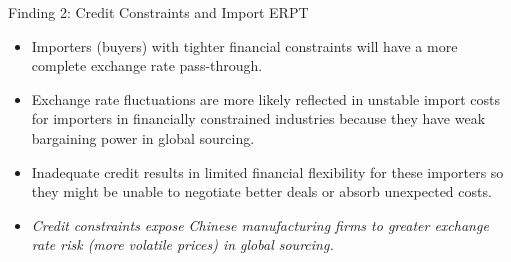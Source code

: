 \documentclass[10pt]{beamer}
\begin{document}
\begin{frame}{Finding 2: Credit Constraints and Import ERPT}
    \begin{tcolorbox}[colback=blue!5!white, colframe=blue!75!black,title=Finding 2]
	\begin{itemize}
		\item Importers (buyers) with tighter financial constraints will have a more complete exchange rate pass-through.
	\end{itemize}
    \end{tcolorbox}
    \begin{itemize}
	\item Exchange rate fluctuations are more likely reflected in unstable import costs for importers in financially constrained industries because they have weak bargaining power in global sourcing.
        \item Inadequate credit results in limited financial flexibility for these importers so they might be unable to negotiate better deals or absorb unexpected costs.
	\item \textit{Credit constraints expose Chinese manufacturing firms to greater exchange rate risk (more volatile prices) in global sourcing.}
    \end{itemize}
\end{frame}
\end{document}
